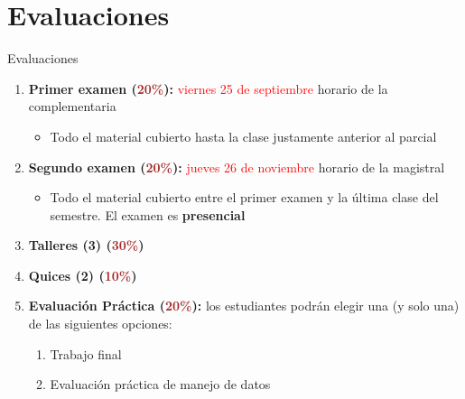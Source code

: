 \documentclass[10pt, xcolor=dvipsnames]{beamer}
\begin{document}
\section{Evaluaciones}

\begin{frame}{Evaluaciones}
\begin{enumerate}
    \item[1.] \textbf{Primer examen (\textcolor{brown}{20\%}):} \textcolor{red}{viernes 25 de septiembre} horario de la complementaria
    \begin{itemize}
        \item Todo el material cubierto hasta la clase justamente anterior al parcial
    \end{itemize}
    \item[2.] \textbf{Segundo examen (\textcolor{brown}{20\%}):} \textcolor{red}{jueves 26 de noviembre} horario de la magistral
    \begin{itemize}
    \item Todo el material cubierto entre el primer examen y la última clase del semestre. El examen es \textbf{presencial}
    \end{itemize}
    \item[3.] \textbf{Talleres (3) (\textcolor{brown}{30\%})}
    \item[4.] \textbf{Quices (2) (\textcolor{brown}{10\%})}		
    \item[5.] \textbf{Evaluación Práctica (\textcolor{brown}{20\%}):} los estudiantes podrán elegir una (y solo una) de las siguientes opciones:
    \begin{enumerate}
    \item[a)] Trabajo final 
    \item[b)] Evaluación práctica de manejo de datos
    \end{enumerate}
    \end{enumerate}
\end{frame}
\end{document}
